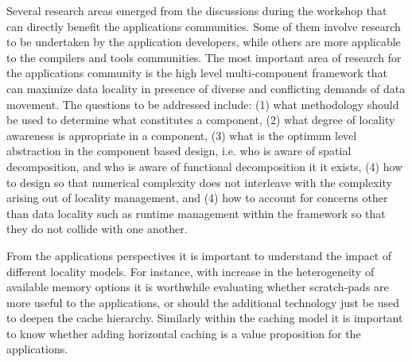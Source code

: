 Several research areas emerged from the discussions during the
workshop that can directly benefit the applications communities. Some
of them involve research to be undertaken by the application
developers, while others are more applicable to the compilers and
tools communities. The most important area of research for the
applications community is the high level multi-component framework
that can maximize data locality in presence of diverse and conflicting
demands of data movement. The questions to be addressed include: (1)
what methodology should be used to determine what constitutes a
component, (2) what degree of locality awareness is appropriate in a
component, (3) what is the optimum level abstraction in the component
based design, i.e. who is aware of spatial decomposition, and who is
aware of functional decomposition it it exists, (4) how to design so that
numerical complexity does not interleave with the complexity arising
out of locality management, and (4) how to account for concerns other
than data locality such as runtime management within the framework so
that they do not collide with one another. 

From the applications perspectives it is important to understand the
impact of different locality models. For instance, with increase in
the heterogeneity of available memory options it is worthwhile
evaluating whether scratch-pads are more useful to the applications,
or should the additional technology just be used to deepen the cache
hierarchy. Similarly within the caching model it is important to know
whether adding horizontal caching is a value proposition for the
applications. 